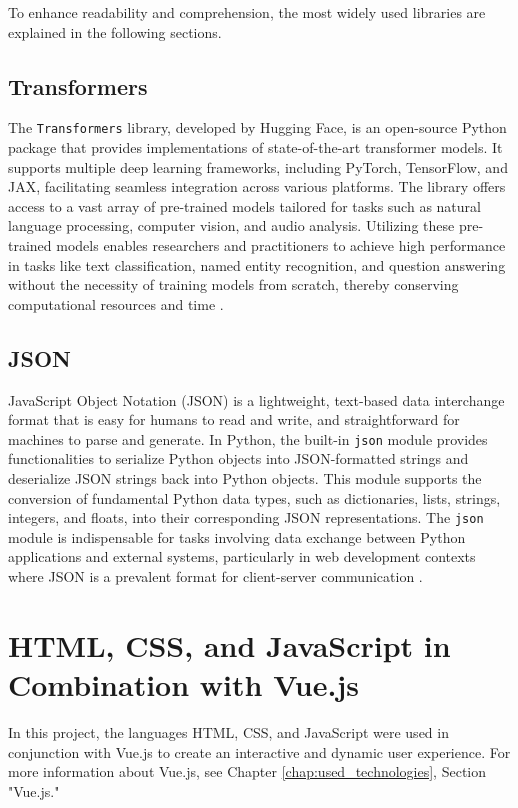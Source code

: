 To enhance readability and comprehension, the most widely used libraries are explained in the following sections.

\subsection{Transformers}

The \texttt{Transformers} library, developed by Hugging Face, is an open-source Python package that provides implementations of state-of-the-art transformer models. 
It supports multiple deep learning frameworks, including PyTorch, TensorFlow, and JAX, facilitating seamless integration across various platforms. 
The library offers access to a vast array of pre-trained models tailored for tasks such as natural language processing, computer vision, 
and audio analysis. Utilizing these pre-trained models enables researchers and practitioners to achieve high performance in tasks like text classification, 
named entity recognition, and question answering without the necessity of training models from scratch, thereby conserving computational resources and time 
\cite{wolf-etal-2020-transformers}.

\subsection{JSON}

JavaScript Object Notation (JSON) is a lightweight, text-based data interchange format that is easy for humans to read and write, and straightforward for machines to parse and generate. In Python, the built-in \texttt{json} module provides functionalities to serialize Python objects into JSON-formatted strings and deserialize JSON strings back into Python objects. This module supports the conversion of fundamental Python data types, such as dictionaries, lists, strings, integers, and floats, into their corresponding JSON representations. The \texttt{json} module is indispensable for tasks involving data exchange between Python applications and external systems, particularly in web development contexts where JSON is a prevalent format for client-server communication 
\cite{python-json}.


\section{HTML, CSS, and JavaScript in Combination with Vue.js}

In this project, the languages HTML, CSS, and JavaScript were used in conjunction with Vue.js to create an interactive and dynamic user experience. For more information about Vue.js, see Chapter \ref{chap:used_technologies}, Section "Vue.js."

